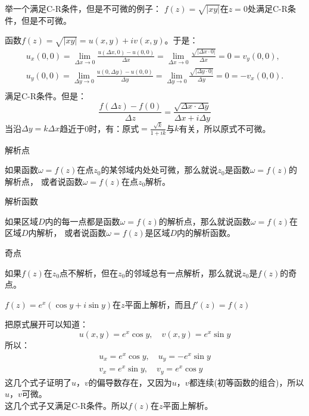 \documentclass[cn,hazy,blue,14pt,normal]{elegantnote}
\numberwithin{equation}{section}
\begin{document}
\begin{example}
	举一个满足C-R条件，但是不可微的例子：
	$f(z)=\sqrt{|xy|}$在$z=0$处满足C-R条件，但是不可微。
\end{example}
函数$f(z)=\sqrt{|xy|}=u(x,y)+iv(x,y)$。于是：\\
\begin{gather*}
	u_x(0,0)=\lim_{\Delta x\to0}\frac{u(\Delta x,0)-u(0,0)}{\Delta x}=\lim_{\Delta x\to0}\frac{\sqrt{|\Delta x\cdot0|}}{\Delta x}=0=v_y(0,0),\\
	u_y(0,0)=\lim_{\Delta y\to0}\frac{u(0,\Delta y)-u(0,0)}{\Delta y}=\lim_{\Delta y\to0}\frac{\sqrt{|\Delta y\cdot0|}}{\Delta y}=0=-v_x(0,0).\\
\end{gather*}
满足C-R条件。但是：\\
\begin{equation*}
	\frac{f(\Delta z)-f(0)}{\Delta z}=\frac{\sqrt{\Delta x \cdot \Delta y}}{\Delta x+i\Delta y}
\end{equation*}
当沿$\Delta y=k\Delta x$趋近于0时，有：原式$=\frac{\sqrt{k}}{1+ik}$与$k$有关，所以原式不可微。

\begin{definition}
	解析点
\end{definition}
如果函数$\omega=f(z)$在点$z_0$的某邻域内处处可微，那么就说$z_0$是函数$\omega=f(z)$的解析点，
或者说函数$\omega=f(z)$在点$z_0$解析。

\begin{definition}
	解析函数
\end{definition}
如果区域$D$内的每一点都是函数$\omega=f(z)$的解析点，那么就说函数$\omega=f(z)$在区域$D$内解析，
或者说函数$\omega=f(z)$是区域$D$内的解析函数。

\begin{definition}
	奇点
\end{definition}
如果$f(z)$在$z_0$点不解析，但在$z_0$的邻域总有一点解析，那么就说$z_0$是$f(z)$的奇点。

\begin{example}
	$f(z)=e^x(\cos y+i\sin y)$在$z$平面上解析，而且$f'(z)=f(z)$
\end{example}

把原式展开可以知道：
$$
u(x,y)=e^x\cos y,\quad v(x,y)=e^x\sin y
$$
所以：
\begin{gather*}
	u_x=e^x\cos y,\quad u_y=-e^x\sin y\\
	v_x=e^x\sin y,\quad v_y=e^x\cos y
\end{gather*}
这几个式子证明了$u，v$的偏导数存在，又因为$u，v$都连续(初等函数的组合)，所以$u，v$可微。\\
这几个式子又满足C-R条件。所以$f(z)$在$z$平面上解析。\\
\end{document}
